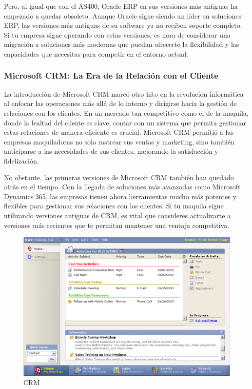 \documentclass[
  letterpaper,
]{book}
\begin{document}
Pero, al igual que con el AS400, Oracle ERP en sus versiones más
antiguas ha empezado a quedar obsoleto. Aunque Oracle sigue siendo un
líder en soluciones ERP, las versiones más antiguas de su software ya no
reciben soporte completo. Si tu empresa sigue operando con estas
versiones, es hora de considerar una migración a soluciones más modernas
que puedan ofrecerte la flexibilidad y las capacidades que necesitas
para competir en el entorno actual.

\subsubsection{Microsoft CRM: La Era de la Relación con el
Cliente}\label{microsoft-crm-la-era-de-la-relaciuxf3n-con-el-cliente}

La introducción de Microsoft CRM marcó otro hito en la revolución
informática al enfocar las operaciones más allá de lo interno y
dirigirse hacia la gestión de relaciones con los clientes. En un mercado
tan competitivo como el de la maquila, donde la lealtad del cliente es
clave, contar con un sistema que permita gestionar estas relaciones de
manera eficiente es crucial. Microsoft CRM permitió a las empresas
maquiladoras no solo rastrear sus ventas y marketing, sino también
anticiparse a las necesidades de sus clientes, mejorando la satisfacción
y fidelización.

No obstante, las primeras versiones de Microsoft CRM también han quedado
atrás en el tiempo. Con la llegada de soluciones más avanzadas como
Microsoft Dynamics 365, las empresas tienen ahora herramientas mucho más
potentes y flexibles para gestionar sus relaciones con los clientes. Si
tu maquila sigue utilizando versiones antiguas de CRM, es vital que
consideres actualizarte a versiones más recientes que te permitan
mantener una ventaja competitiva.

\begin{figure}[H]

{\centering \includegraphics{Img/crm.png}

}

\caption{CRM}

\end{figure}%
\end{document}
